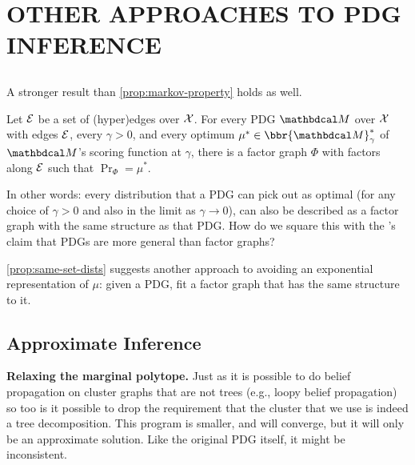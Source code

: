 \documentclass[twoside]{article}
\begin{document}
\section{OTHER APPROACHES TO PDG INFERENCE} \label{sec:other-inference}

\subsection{}
A stronger result than \cref{prop:markov-property} holds as well.
\begin{prop}\label{prop:same-set-dists}
    Let $\mathcal E$ be a set of (hyper)edges over $\mathcal X$. 
    For every PDG $\dg M$ over $\mathcal X$ with edges $\mathcal E$, every $\gamma > 0$, and every optimum $\mu^* \in \bbr{\dg M}_\gamma^*$ of $\dg M$'s scoring function at $\gamma$, 
    there is a factor graph $\Phi$ with factors along $\mathcal E$ such that $\Pr_\Phi = \mu^*$. 
\end{prop}

In other words: every distribution that a PDG can pick out as optimal (for any choice of $\gamma > 0$ and also in the limit as $\gamma \to 0$), can also be described as a factor graph with the same structure as that PDG.
How do we square this with the \citeauthor{pdg-aaai}'s claim that PDGs are more general than factor graphs?



\cref{prop:same-set-dists} suggests another approach to avoiding an exponential representation of $\mu$: given a PDG, fit a factor graph that has the same structure to it. 

\subsection{Approximate Inference}
\textbf{Relaxing the marginal polytope.}
Just as it is possible to do belief propagation on cluster graphs that are not trees (e.g., loopy belief propagation)
so too is it possible to drop the requirement that the cluster that we use is indeed a tree decomposition.
This program is smaller, and will converge, but it will only be an approximate solution. 
Like the original PDG itself, it might be inconsistent. 
\end{document}
